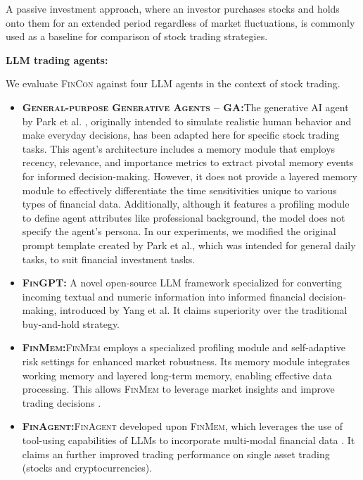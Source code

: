 A passive investment approach, where an investor purchases stocks and holds onto them for an extended period regardless of market fluctuations, is commonly used as a baseline for comparison of stock trading strategies. 

\textbf{LLM trading agents:} 

We evaluate \textsc{FinCon} against four LLM agents in the context of stock trading. 

\begin{itemize}
   \item \textbf{\textsc{General-purpose Generative Agents -- GA:}}The generative AI agent by Park et al. \cite{park2023generative}, originally intended to simulate realistic human behavior and make everyday decisions, has been adapted here for specific stock trading tasks. This agent's architecture includes a memory module that employs recency, relevance, and importance metrics to extract pivotal memory events for informed decision-making. However, it does not provide a layered memory module to effectively differentiate the time sensitivities unique to various types of financial data. Additionally, although it features a profiling module to define agent attributes like professional background, the model does not specify the agent's persona. In our experiments, we modified the original prompt template created by Park et al., which was intended for general daily tasks, to suit financial investment tasks. 
 \item \textbf{\textsc{FinGPT}:} A novel open-source LLM framework specialized for converting incoming textual and numeric information into informed financial decision-making, introduced by Yang et al\cite{yang2023fingpt}. It claims superiority over the traditional buy-and-hold strategy.

 \item \textbf{\textsc{FinMem}:}\textsc{FinMem} employs a specialized profiling module and self-adaptive risk settings for enhanced market robustness. Its memory module integrates working memory and layered long-term memory, enabling effective data processing. This allows \textsc{FinMem} to leverage market insights and improve trading decisions \cite{yu2023finmem}.
 
  \item \textbf{\textsc{FinAgent}:}\textsc{FinAgent} developed upon \textsc{FinMem}, which leverages the use of tool-using capabilities of LLMs to incorporate multi-modal financial data  \cite{zhang2024finagent}. It claims an further improved trading performance on single asset trading (stocks and cryptocurrencies).

\end{itemize}


